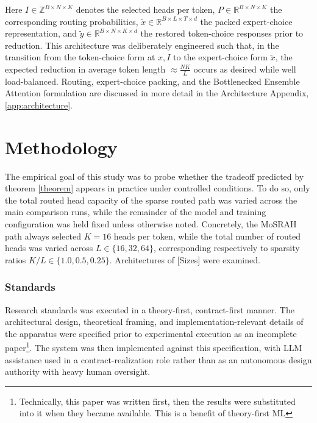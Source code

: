 \documentclass[11pt]{article}
\begin{document}
Here $I \in \mathbb{Z}^{B \times N \times K}$ denotes the selected heads per token, $P \in \mathbb{R}^{B \times N \times K}$ the corresponding routing probabilities, $\tilde{x} \in \mathbb{R}^{B \times L \times T \times d}$ the packed expert-choice representation, and $\tilde{y} \in \mathbb{R}^{B \times N \times K \times d}$ the restored token-choice responses prior to reduction. This architecture was deliberately engineered such that, in the transition from the token-choice form at $x, I$ to the expert-choice form $\tilde{x}$, the expected reduction in average token length $\approx \frac{NK}{L}$ occurs as desired while well load-balanced. Routing, expert-choice packing, and the Bottlenecked Ensemble Attention formulation are discussed in more detail in the Architecture Appendix, \ref{app:architecture}.

\section{Methodology}

The empirical goal of this study was to probe whether the tradeoff predicted by theorem \ref{theorem} appears in practice under controlled conditions. To do so, only the total routed head capacity of the sparse routed path was varied across the main comparison runs, while the remainder of the model and training configuration was held fixed unless otherwise noted. Concretely, the MoSRAH path always selected $K=16$ heads per token, while the total number of routed heads was varied across $L \in \{16, 32, 64\}$, corresponding respectively to sparsity ratios $K/L \in \{1.0, 0.5, 0.25\}$. Architectures of [Sizes] were examined.

\subsubsection{Standards}

Research standards was executed in a theory-first, contract-first manner. The architectural design, theoretical framing, and implementation-relevant details of the apparatus were specified prior to experimental execution as an incomplete paper\footnote{Technically, this paper was written first, then the results were substituted into it when they became available. This is a benefit of theory-first ML}. The system was then implemented against this specification, with LLM assistance used in a contract-realization role rather than as an autonomous design authority with heavy human oversight.
\end{document}
